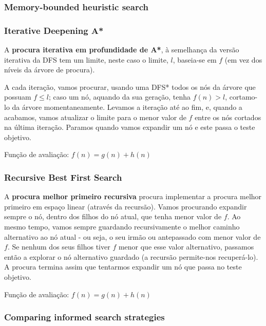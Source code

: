 \documentclass[11pt]{article}
\begin{document}
\subsubsection{Memory-bounded heuristic search}

\subsubsection*{Iterative Deepening A*}

A \textbf{procura iterativa em profundidade de A*}, à semelhança da versão iterativa da DFS tem um limite, neste caso o limite, $l$, baseia-se em $f$ (em vez dos níveis da árvore de procura).\vspace{4pt}

A cada iteração, vamos procurar, usando uma DFS* todos os nós da árvore que possuam $f\leq l$; caso um nó, aquando da sua geração, tenha $f(n)>l$, cortamo-lo da árvore momentaneamente. Levamos a iteração até ao fim, e, quando a acabamos, vamos atualizar o limite para o menor valor de $f$ entre os nós cortados na última iteração. Paramos quando vamos expandir um nó e este passa o teste objetivo.\vspace{10pt}

Função de avaliação: $f(n) = g(n) + h(n)$

\subsubsection*{Recursive Best First Search}

A \textbf{procura melhor primeiro recursiva} procura implementar a procura melhor primeiro em espaço linear (através da recursão). Vamos procurando expandir sempre o nó, dentro dos filhos do nó atual, que tenha menor valor de $f$. Ao mesmo tempo, vamos sempre guardando recursivamente o melhor caminho alternativo ao nó atual - ou seja, o seu irmão ou antepassado com menor valor de $f$. Se nenhum dos seus filhos tiver $f$ menor que esse valor alternativo, passamos então a explorar o nó alternativo guardado (a recursão permite-nos recuperá-lo). A procura termina assim que tentarmos expandir um nó que passa no teste objetivo.\vspace{10pt}

Função de avaliação: $f(n) = g(n) + h(n)$

\subsubsection{Comparing informed search strategies}
\end{document}

